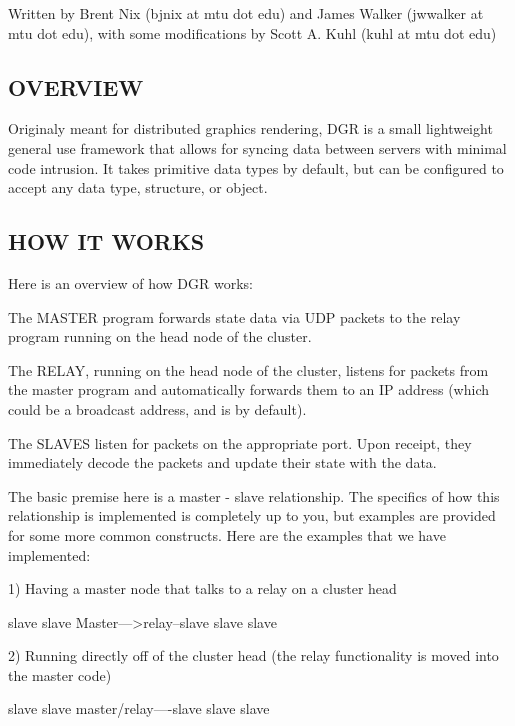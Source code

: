 Written by Brent Nix (bjnix at mtu dot edu) and James Walker (jwwalker at mtu dot edu), with some modifications by Scott A. Kuhl (kuhl at mtu dot edu)

\subsection*{O\+V\+E\+R\+V\+I\+E\+W }

Originaly meant for distributed graphics rendering, D\+G\+R is a small lightweight general use framework that allows for syncing data between servers with minimal code intrusion. It takes primitive data types by default, but can be configured to accept any data type, structure, or object.

\subsection*{H\+O\+W I\+T W\+O\+R\+K\+S }

Here is an overview of how D\+G\+R works\+:

The M\+A\+S\+T\+E\+R program forwards state data via U\+D\+P packets to the relay program running on the head node of the cluster.

The R\+E\+L\+A\+Y, running on the head node of the cluster, listens for packets from the master program and automatically forwards them to an I\+P address (which could be a broadcast address, and is by default).

The S\+L\+A\+V\+E\+S listen for packets on the appropriate port. Upon receipt, they immediately decode the packets and update their state with the data.

The basic premise here is a master -\/ slave relationship. The specifics of how this relationship is implemented is completely up to you, but examples are provided for some more common constructs. Here are the examples that we have implemented\+:

1) Having a master node that talks to a relay on a cluster head \begin{DoxyVerb}                                                           {slave}
                                                           {slave}
                                      {Master}--->{relay}--{slave}
                                                           {slave}
                                                           {slave}
\end{DoxyVerb}


2) Running directly off of the cluster head (the relay functionality is moved into the master code) \begin{DoxyVerb}                                                           {slave}
                                                           {slave}
                                         {master/relay}----{slave}
                                                           {slave}
                                                           {slave}
\end{DoxyVerb}



